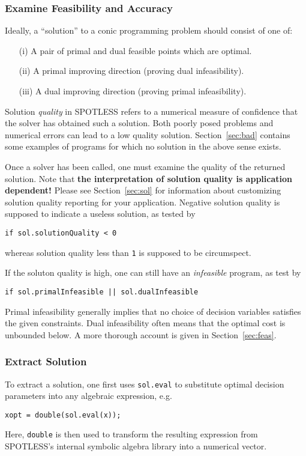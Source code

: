\documentclass{scrartcl}
\newcommand{\li}[1]{\lstinline{#1}}
\newcommand{\spotless}{SPOT{\relsize{-2}LESS}\xspace}
\begin{document}
\subsubsection{Examine Feasibility and Accuracy}
Ideally, a ``solution'' to a conic programming problem should consist of one of:
\begin{enumerate}
  \item[(i)] A pair of primal and dual feasible points which are optimal.
  \item[(ii)] A primal improving direction (proving dual infeasibility).
  \item[(iii)] A dual improving direction (proving primal infeasibility).
\end{enumerate}
Solution {\it quality} in \spotless refers to a numerical measure of confidence that the solver has obtained such a solution.
Both poorly posed problems and numerical errors can lead to a low quality solution.
Section~\ref{sec:bad} contains some examples of programs for which no solution in the above sense exists.

Once a solver has been called, one must examine the quality of the returned solution. Note that {\bf the interpretation of solution quality is application dependent!}  Please see Section~\ref{sec:sol} for information about customizing solution quality reporting for your application.  
Negative solution quality is supposed to indicate a useless solution, as tested by
\begin{lstlisting}[frame=none,firstnumber=13]
if sol.solutionQuality < 0
\end{lstlisting}
whereas solution quality less than \li{1} is supposed to be circumspect.

If the soluton quality is high, one can still have an {\it infeasible} program, as test by
\begin{lstlisting}[frame=none,firstnumber=18]
if sol.primalInfeasible || sol.dualInfeasible
\end{lstlisting}
Primal infeasibility generally implies that no choice of decision variables satisfies the given constraints.  Dual infeasibility often means that the optimal cost is unbounded below.  A more thorough account is given in Section~\ref{sec:feas}.
\subsubsection{Extract Solution}
To extract a solution, one first uses \li{sol.eval} to substitute optimal decision parameters into any algebraic expression, e.g.
\begin{lstlisting}[frame=none,firstnumber=18]
xopt = double(sol.eval(x));
\end{lstlisting}
Here, \li{double} is then used to transform the resulting expression from \spotless's internal symbolic algebra library into a numerical vector.
\end{document}
